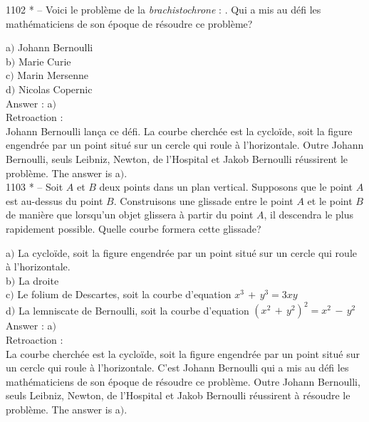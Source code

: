 ﻿\documentclass[letterpaper, 12pt]{article}
\begin{document}
1102 * -- Voici le probl\`eme de la {\it brachistochrone} : \fg. Qui a mis au
d\'efi les math\'ematiciens de son \'epoque de r\'esoudre ce
probl\`eme?

a$)$ Johann Bernoulli \\
b$)$ Marie Curie  \\
c$)$ Marin Mersenne  \\
d$)$ Nicolas Copernic \\

Answer : a$)$\\

Retroaction : \\
Johann Bernoulli lan\c ca ce d\'efi. La courbe cherch\'ee est la
cyclo\"ide, soit la figure engendr\'ee par un point situ\'e sur un
cercle qui roule \`a l'horizontale. Outre Johann Bernoulli, seuls
Leibniz, Newton, de l'Hospital et Jakob Bernoulli r\'eussirent le
probl\`eme.
The answer is a$)$.\\

1103 * -- Soit $A$ et $B$ deux points dans un plan vertical.
Supposons que le point $A$ est au-dessus du point $B$. Construisons
une glissade entre le point $A$ et le point $B$ de mani\`ere que
lorsqu'un objet glissera \`a partir du point $A$, il descendra le
plus rapidement possible. Quelle courbe formera cette glissade?

a$)$ La cyclo\"ide, soit la figure engendr\'ee par un point situ\'e
sur un
cercle qui roule \`a l'horizontale. \\
b$)$ La droite  \\
c$)$ Le folium de Descartes, soit la courbe d'equation $x^3\,+\,y^3=3xy$
\\
d$)$ La lemniscate de Bernoulli, soit la courbe d'equation
$(x^2\,+\,y^2)^2=x^2\,-\,y^2$\\

Answer : a$)$\\

Retroaction : \\
La courbe cherch\'ee est la cyclo\"ide, soit la figure engendr\'ee
par un point situ\'e sur un cercle qui roule \`a l'horizontale.
C'est Johann Bernoulli qui a mis au d\'efi les math\'ematiciens de
son \'epoque de r\'esoudre ce probl\`eme. Outre Johann Bernoulli,
seuls Leibniz, Newton, de l'Hospital et Jakob Bernoulli r\'eussirent
\`a r\'esoudre le probl\`eme.
The answer is a$)$.\\
\end{document}
